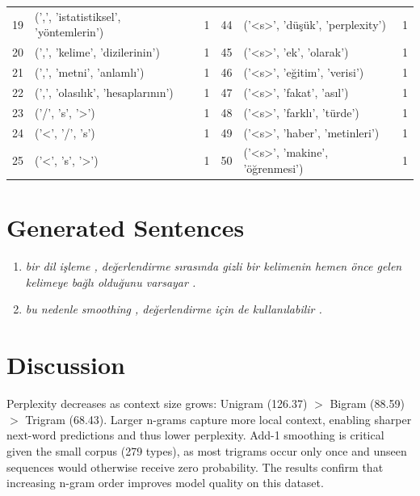 \documentclass[a4paper,10pt]{article}
\begin{document}
\begin{center}
\begin{tabular}{rlr|rlr}
19 & (',', 'istatistiksel', 'y\"ontemlerin') & 1 & 44 & ('<s>', 'd\"u\c{s}\"uk', 'perplexity') & 1 \\
20 & (',', 'kelime', 'dizilerinin') & 1 & 45 & ('<s>', 'ek', 'olarak') & 1 \\
21 & (',', 'metni', 'anlaml\i') & 1 & 46 & ('<s>', 'e\u{g}itim', 'verisi') & 1 \\
22 & (',', 'olas\i l\i k', 'hesaplar\i n\i n') & 1 & 47 & ('<s>', 'fakat', 'as\i l') & 1 \\
23 & ('/', 's', '>') & 1 & 48 & ('<s>', 'farkl\i', 't\"urde') & 1 \\
24 & ('<', '/', 's') & 1 & 49 & ('<s>', 'haber', 'metinleri') & 1 \\
25 & ('<', 's', '>') & 1 & 50 & ('<s>', 'makine', '\"o\u{g}renmesi') & 1 \\
\bottomrule
\end{tabular}
\end{center}
\vspace{-4pt}

\section{Generated Sentences}
\vspace{-2pt}
\begin{enumerate}[nosep, leftmargin=1.5em]
    \item \textit{bir dil i\c{s}leme , de\u{g}erlendirme s\i ras\i nda gizli bir kelimenin hemen \"once gelen kelimeye ba\u{g}l\i{} oldu\u{g}unu varsayar .}
    \item \textit{bu nedenle smoothing , de\u{g}erlendirme i\c{c}in de kullan\i labilir .}
\end{enumerate}

\section{Discussion}
Perplexity decreases as context size grows: Unigram (126.37) $>$ Bigram (88.59) $>$ Trigram (68.43). Larger n-grams capture more local context, enabling sharper next-word predictions and thus lower perplexity. Add-1 smoothing is critical given the small corpus (279 types), as most trigrams occur only once and unseen sequences would otherwise receive zero probability. The results confirm that increasing n-gram order improves model quality on this dataset.
\end{document}
